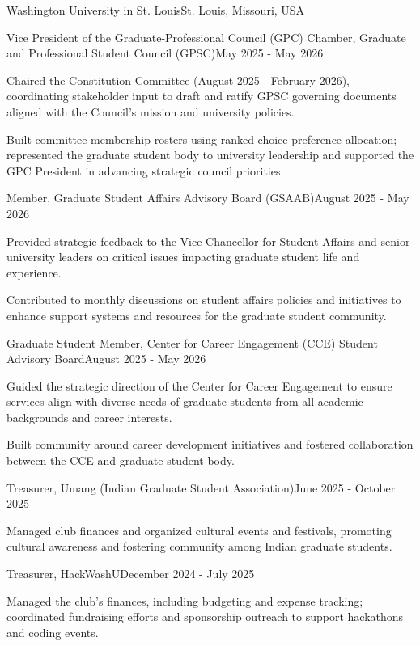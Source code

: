 \documentclass[10pt, letterpaper]{article}
\begin{document}
\begin{leadershipentry}{Washington University in St. Louis}{St. Louis, Missouri, USA}
	\begin{positionentry}{Vice President of the Graduate-Professional Council (GPC) Chamber, Graduate and Professional Student Council (GPSC)}{May 2025 - May 2026}
		\item Chaired the Constitution Committee (August 2025 - February 2026), coordinating stakeholder input to draft and ratify GPSC governing documents aligned with the Council's mission and university policies.
		\item Built committee membership rosters using ranked-choice preference allocation; represented the graduate student body to university leadership and supported the GPC President in advancing strategic council priorities.
	\end{positionentry}
	\begin{positionentry}{Member, Graduate Student Affairs Advisory Board (GSAAB)}{August 2025 - May 2026}
		\item Provided strategic feedback to the Vice Chancellor for Student Affairs and senior university leaders on critical issues impacting graduate student life and experience.
		\item Contributed to monthly discussions on student affairs policies and initiatives to enhance support systems and resources for the graduate student community.
	\end{positionentry}
	\begin{positionentry}{Graduate Student Member, Center for Career Engagement (CCE) Student Advisory Board}{August 2025 - May 2026}
		\item Guided the strategic direction of the Center for Career Engagement to ensure services align with diverse needs of graduate students from all academic backgrounds and career interests.
		\item Built community around career development initiatives and fostered collaboration between the CCE and graduate student body.
	\end{positionentry}
	\begin{positionentry}{Treasurer, Umang (Indian Graduate Student Association)}{June 2025 - October 2025}
		\item Managed club finances and organized cultural events and festivals, promoting cultural awareness and fostering community among Indian graduate students.
	\end{positionentry}
	\begin{positionentry}{Treasurer, HackWashU}{December 2024 - July 2025}
		\item Managed the club's finances, including budgeting and expense tracking; coordinated fundraising efforts and sponsorship outreach to support hackathons and coding events.
	\end{positionentry}
\end{leadershipentry}
\end{document}
